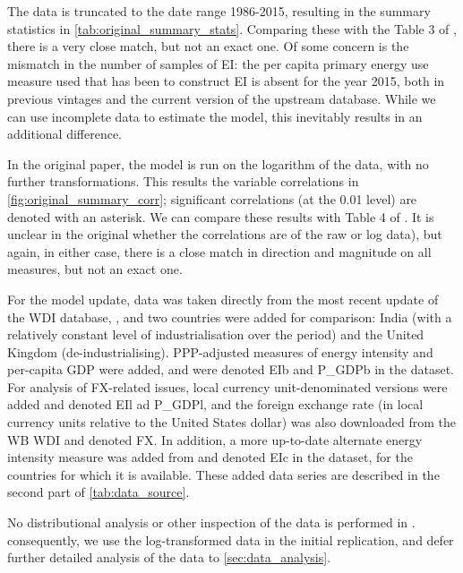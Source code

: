 \documentclass[11pt,a4paper]{article}
\begin{document}
The data is truncated to the date range 1986-2015, resulting in the summary statistics in \cref{tab:original_summary_stats}.
Comparing these with the Table 3 of \cite{panHowIndustrializationTrade2019}, there is a very close match, but not an exact one.
Of some concern is the mismatch in the number of samples of EI: the per capita primary energy use measure used that has been to construct EI is absent for the year 2015, both in previous vintages and the current version of the upstream database.
While we can use incomplete data to estimate the model, this inevitably results in an additional difference.

In the original paper, the model is run on the logarithm of the data, with no further transformations. 
This results the variable correlations in \cref{fig:original_summary_corr}; significant correlations (at the 0.01 level) are denoted with an asterisk.
We can compare these results with Table 4 of \cite{panHowIndustrializationTrade2019}. 
It is unclear in the original whether the correlations are of the raw or log data), but again, in either case, there is a close match in direction and magnitude on all measures, but not an exact one.

For the model update, data was taken directly from the most recent update of the WDI database, \cite{theworldbankWorldDevelopmentIndicators2019}, and two countries were added for comparison: India (with a relatively constant level of industrialisation over the period) and the United Kingdom (de-industrialising). 
PPP-adjusted measures of energy intensity and per-capita GDP were added, and were denoted EIb and P\_GDPb in the dataset. 
For analysis of FX-related issues, local currency unit-denominated versions were added and denoted EIl ad P\_GDPl, and the foreign exchange rate (in local currency units relative to the United States dollar) was also downloaded from the WB WDI and denoted FX.
In addition, a more up-to-date alternate energy intensity measure was added from \cite{enerdataGlobalEnergyStatistical2019} and denoted EIc in the dataset, for the countries for which it is available.
These added data series are described in the second part of \cref{tab:data_source}.

No distributional analysis or other inspection of the data is performed in \cite{panHowIndustrializationTrade2019}.
consequently, we use the log-transformed data in the initial replication, and defer further detailed analysis of the data to \cref{sec:data_analysis}.
\end{document}
